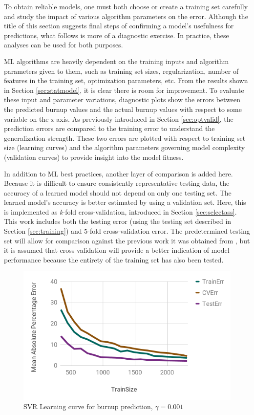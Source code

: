 To obtain reliable models, one must both choose or create a training set
carefully and study the impact of various algorithm parameters on the error.
Although the title of this section suggests final steps of confirming a model's
usefulness for predictions, what follows is more of a diagnostic exercise. 
In practice, these analyses can be used for both purposes.

\gls{ML} algorithms are heavily dependent on the training inputs and algorithm
parameters given to them, such as training set sizes, regularization, number of
features in the training set, optimization parameters, etc.  From the results
shown in Section \ref{sec:statmodel}, it is clear there is room for
improvement.  To evaluate these input and parameter variations, diagnostic
plots show the errors between the predicted burnup values and the actual burnup
values with respect to some variable on the \textit{x}-axis.  As previously
introduced in Section \ref{sec:optvalid}, the prediction errors are compared to
the training error to understand the generalization strength. These two errors
are plotted with respect to training set size (learning curves) and the
algorithm parameters governing model complexity (validation curves) to provide
insight into the model fitness. 

In addition to \gls{ML} best practices, another layer of comparison is
added here.  Because it is difficult to ensure consistently representative
testing data, the accuracy of a learned model should not depend on only one
testing set.  The learned model's accuracy is better estimated by using a
validation set. Here, this is implemented as \textit{k}-fold cross-validation,
introduced in Section \ref{sec:selectass}. This work includes both the testing
error (using the testing set described in Section \ref{sec:training}) and
5-fold cross-validation error. The predetermined testing set will allow for
comparison against the previous work it was obtained from
\cite{dayman_feasibility_2013}, but it is assumed that cross-validation will
provide a better indication of model performance because the entirety of the
training set has also been tested. 

\begin{figure}[!htb]
    \centering
    \includegraphics[width=\linewidth]{./chapters/demo_method/lc1.png}
    \caption{\acrshort{SVR} Learning curve for burnup prediction, $\gamma = 0.001$}
    \label{fig:lc1}
\end{figure}

